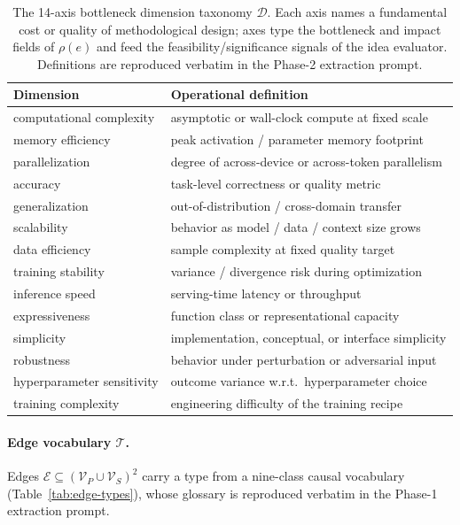 \documentclass{llmxive}
\begin{document}
\begin{table}[!htbp]
\centering
\begin{tabularx}{\linewidth}{l X}
\toprule
Dimension & Operational definition \\
\midrule
computational complexity & asymptotic or wall-clock compute at fixed scale \\
memory efficiency & peak activation / parameter memory footprint \\
parallelization & degree of across-device or across-token parallelism \\
accuracy & task-level correctness or quality metric \\
generalization & out-of-distribution / cross-domain transfer \\
scalability & behavior as model / data / context size grows \\
data efficiency & sample complexity at fixed quality target \\
training stability & variance / divergence risk during optimization \\
inference speed & serving-time latency or throughput \\
expressiveness & function class or representational capacity \\
simplicity & implementation, conceptual, or interface simplicity \\
robustness & behavior under perturbation or adversarial input \\
hyperparameter sensitivity & outcome variance w.r.t.\ hyperparameter choice \\
training complexity & engineering difficulty of the training recipe \\
\bottomrule
\end{tabularx}
\caption{The 14-axis bottleneck dimension taxonomy $\mathcal{D}$. Each axis names a fundamental cost or quality of
methodological design; axes type the bottleneck and impact fields of $\rho(e)$ and feed the
feasibility/significance signals of the idea evaluator. Definitions are reproduced verbatim in the Phase-2
extraction prompt.}
\label{tab:dim-taxonomy}
\end{table}

\paragraph{Edge vocabulary \texorpdfstring{$\mathcal{T}$}{T}.}
Edges $\mathcal{E}\subseteq(\mathcal{V}_P\cup\mathcal{V}_S)^2$ carry a type from a nine-class causal vocabulary
(Table~\ref{tab:edge-types}), whose glossary is reproduced verbatim in the Phase-1 extraction prompt.
\end{document}
